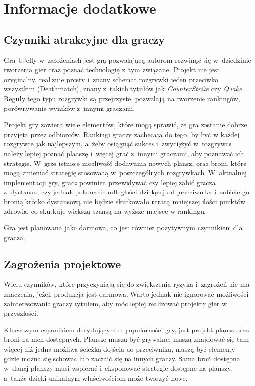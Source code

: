 \chapter{Informacje dodatkowe}

\section{Czynniki atrakcyjne dla graczy}
Gra UJelly w~założeniach jest grą pozwalającą autorom rozwinąć się w~dziedzinie tworzenia gier oraz poznać technologię z~tym związane. Projekt nie jest oryginalny, realizuje prosty i~znany schemat rozgrywki jeden przeciwko wszystkim (Deathmatch), znany z~takich tytułów jak \textit{CounterStrike} czy \textit{Quake}. Reguły tego typu rozgrywki są przejrzyste, pozwalają na tworzenie rankingów, porównywanie wyników z~innymi graczami.

Projekt gry zawiera wiele elementów, które mogą sprawić, że gra zostanie dobrze przyjęta przez odbiorców. Rankingi graczy zachęcają do tego, by być w każdej rozgrywce jak najlepszym, a~żeby osiągnąć sukces i~zwyciężyć w~rozgrywce należy lepiej poznać planszę i~więcej grać z~innymi graczami, aby poznawać ich strategie.
W~grze istnieje możliwość dodawania nowych plansz, oraz broni, które mogą zmieniać strategię stosowaną w~poszczególnych rozgrywkach.
W~aktualnej implementacji gry, gracz powinien przewidywać czy lepiej zabić gracza z~dystansu, czy jednak pokonanie odległości dzielącej od przeciwnika i~zabicie go bronią krótko dystansową nie będzie skutkowało utratą mniejszej ilości punktów zdrowia, co skutkuje większą szansą na wyższe miejsce w rankingu.

Gra jest planowana jako darmowa, co jest również pozytywnym czynnikiem dla gracza.

\section{Zagrożenia projektowe}
Wielu czynników, które przyczyniają się do zwiększenia ryzyka i~zagrożeń nie ma znaczenia, jeżeli produkcja jest darmowa. Warto jednak nie ignorować możliwości zainteresowania graczy tytułem, aby móc lepiej realizować projekty gier w przyszłości.

Kluczowym czynnikiem decydującym o~popularności gry, jest projekt plansz oraz broni na nich dostępnych. Plansze muszą być grywalne, muszą znajdować się tam więcej niż jedna możliwa ścieżka dojścia do przeciwnika, muszą być elementy gdzie można się schować lub zaczaić się na innych graczy. Sama broń dostępna w~danej planszy musi wspierać i~eksponować strategie dostępne na planszy, a~także dzięki unikalnym właściwościom może tworzyć nowe.

